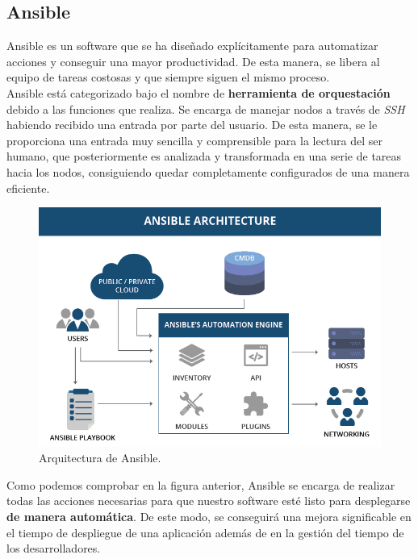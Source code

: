 \subsection{Ansible}

Ansible\cite{ansible} es un software que se ha diseñado explícitamente para automatizar acciones y
conseguir una mayor productividad. De esta manera, se libera al equipo de tareas costosas
y que siempre siguen el mismo proceso.\\

Ansible está categorizado bajo el nombre de \textbf{herramienta de orquestación} debido a 
las funciones que realiza. Se encarga de manejar nodos a través de \textit{SSH} habiendo recibido
una entrada por parte del usuario. De esta manera, se le proporciona una entrada muy sencilla
y comprensible para la lectura del ser humano, que posteriormente es analizada y transformada
en una serie de tareas hacia los nodos, consiguiendo quedar completamente configurados de una
manera eficiente.\\

\begin{figure}[H]
	\centering
	\includegraphics[scale=0.45]{imagenes/ansible.png}
	\caption{Arquitectura de Ansible.\cite{image-ansible} \label{fig:figura7}}
\end{figure}

Como podemos comprobar en la figura anterior, Ansible se encarga de realizar todas las acciones
necesarias para que nuestro software esté listo para desplegarse \textbf{de manera automática}.
De este modo, se conseguirá una mejora significable en el tiempo de despliegue de una aplicación
además de en la gestión del tiempo de los desarrolladores.\\

